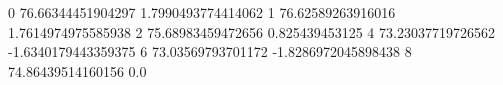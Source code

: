 0 76.66344451904297 1.7990493774414062
1 76.62589263916016 1.7614974975585938
2 75.68983459472656 0.825439453125
4 73.23037719726562 -1.6340179443359375
6 73.03569793701172 -1.8286972045898438
8 74.86439514160156 0.0

